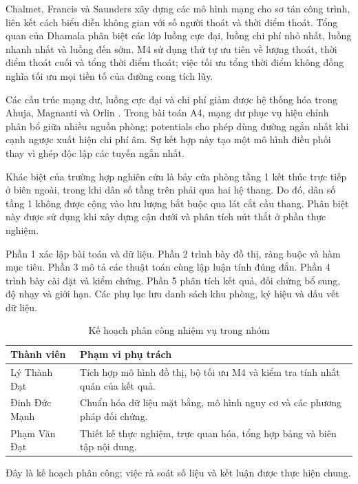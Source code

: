 Chalmet, Francis và Saunders \cite{chalmet} xây dựng các mô hình mạng cho sơ tán công trình, liên kết cách biểu diễn không gian với số người thoát và thời điểm thoát. Tổng quan của Dhamala \cite{survey} phân biệt các lớp luồng cực đại, luồng chi phí nhỏ nhất, luồng nhanh nhất và luồng đến sớm. M4 sử dụng thứ tự ưu tiên về lượng thoát, thời điểm thoát cuối và tổng thời điểm thoát; việc tối ưu tổng thời điểm không đồng nghĩa tối ưu mọi tiền tố của đường cong tích lũy.

Các cấu trúc mạng dư, luồng cực đại và chi phí giảm được hệ thống hóa trong Ahuja, Magnanti và Orlin \cite{ahuja}. Trong bài toán A4, mạng dư phục vụ hiệu chỉnh phân bổ giữa nhiều nguồn phòng; potentials cho phép dùng đường ngắn nhất khi cạnh ngược xuất hiện chi phí âm. Sự kết hợp này tạo một mô hình điều phối thay vì ghép độc lập các tuyến ngắn nhất.

Khác biệt của trường hợp nghiên cứu là bảy cửa phòng tầng 1 kết thúc trực tiếp ở biên ngoài, trong khi dân số tầng trên phải qua hai hệ thang. Do đó, dân số tầng 1 không được cộng vào lưu lượng bắt buộc qua lát cắt cầu thang. Phân biệt này được sử dụng khi xây dựng cận dưới và phân tích nút thắt ở phần thực nghiệm.

Phần 1 xác lập bài toán và dữ liệu. Phần 2 trình bày đồ thị, ràng buộc và hàm mục tiêu. Phần 3 mô tả các thuật toán cùng lập luận tính đúng đắn. Phần 4 trình bày cài đặt và kiểm chứng. Phần 5 phân tích kết quả, đối chứng bổ sung, độ nhạy và giới hạn. Các phụ lục lưu danh sách khu phòng, ký hiệu và dấu vết dữ liệu.

\begin{table}[htbp]\centering\caption{Kế hoạch phân công nhiệm vụ trong nhóm}
\small\begin{tabularx}{\linewidth}{P{3cm}X}\toprule
Thành viên & Phạm vi phụ trách\\\midrule
Lý Thành Đạt & Tích hợp mô hình đồ thị, bộ tối ưu M4 và kiểm tra tính nhất quán của kết quả.\\
Đinh Đức Mạnh & Chuẩn hóa dữ liệu mặt bằng, mô hình nguy cơ và các phương pháp đối chứng.\\
Phạm Văn Đạt & Thiết kế thực nghiệm, trực quan hóa, tổng hợp bảng và biên tập nội dung.\\\bottomrule
\end{tabularx}\end{table}
Đây là kế hoạch phân công; việc rà soát số liệu và kết luận được thực hiện chung.
